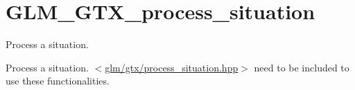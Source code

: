 \hypertarget{group__gtx__process__situation}{\section{G\-L\-M\-\_\-\-G\-T\-X\-\_\-process\-\_\-situation}
\label{group__gtx__process__situation}
}


Process a situation.  


Process a situation. $<$\hyperlink{process__situation_8hpp}{glm/gtx/process\-\_\-situation.\-hpp}$>$ need to be included to use these functionalities. 
